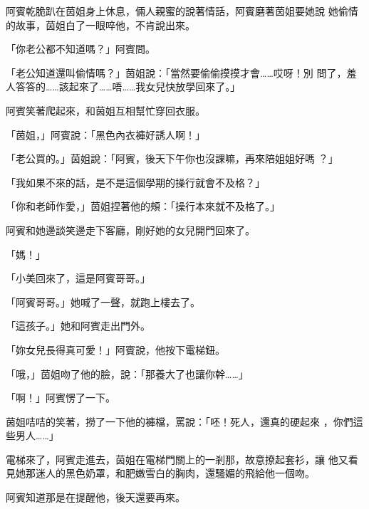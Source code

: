 阿賓乾脆趴在茵姐身上休息，倆人親蜜的說著情話，阿賓磨著茵姐要她說
她偷情的故事，茵姐白了一眼啐他，不肯說出來。

「你老公都不知道嗎？」阿賓問。

「老公知道還叫偷情嗎？」茵姐說：「當然要偷偷摸摸才會……哎呀！別
問了，羞人答答的……該起來了……唔……我女兒快放學回來了。」

阿賓笑著爬起來，和茵姐互相幫忙穿回衣服。

「茵姐，」阿賓說：「黑色內衣褲好誘人啊！」

「老公買的。」茵姐說：「阿賓，後天下午你也沒課嘛，再來陪姐姐好嗎
？」

「我如果不來的話，是不是這個學期的操行就會不及格？」

「你和老師作愛，」茵姐捏著他的頰：「操行本來就不及格了。」

阿賓和她邊談笑邊走下客廳，剛好她的女兒開門回來了。

「媽！」

「小美回來了，這是阿賓哥哥。」

「阿賓哥哥。」她喊了一聲，就跑上樓去了。

「這孩子。」她和阿賓走出門外。

「妳女兒長得真可愛！」阿賓說，他按下電梯鈕。

「哦，」茵姐吻了他的臉，說：「那養大了也讓你幹……」

「啊！」阿賓愣了一下。

茵姐咭咭的笑著，撈了一下他的褲檔，罵說：「呸！死人，還真的硬起來
，你們這些男人……」

電梯來了，阿賓走進去，茵姐在電梯門關上的一剎那，故意撩起套衫，讓
他又看見她那迷人的黑色奶罩，和肥嫩雪白的胸肉，還騷媚的飛給他一個吻。

阿賓知道那是在提醒他，後天還要再來。










